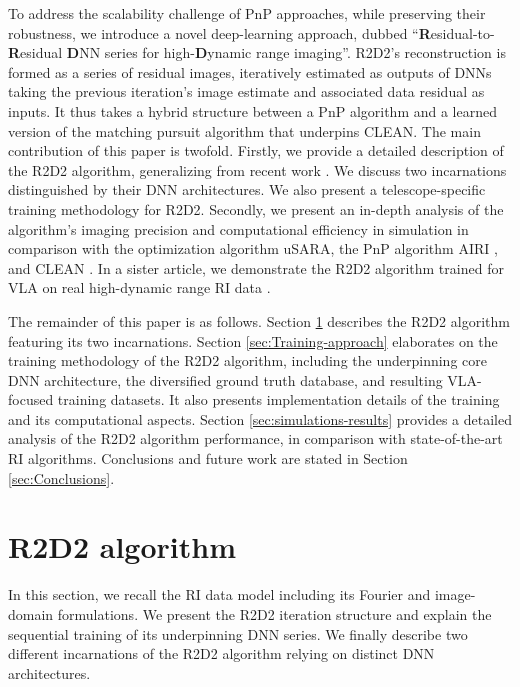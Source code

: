 \documentclass[preprint2,twocolumn]{aastex631}
\begin{document}
To address the scalability challenge of PnP approaches, while preserving their robustness, we introduce a novel deep-learning approach, dubbed ``\textbf{R}esidual-to-\textbf{R}esidual \textbf{D}NN series for high-\textbf{D}ynamic range imaging''. R2D2's reconstruction is formed as a series of residual images, iteratively estimated as outputs of DNNs taking the previous iteration's image estimate and associated data residual as inputs. It thus takes a hybrid structure between a PnP algorithm and a learned version of the matching pursuit algorithm that underpins CLEAN.
The main contribution of this paper is twofold. Firstly, we provide a detailed description of the R2D2 algorithm, generalizing from recent work \citep{aghabiglou2023a,Hauptmann2018}. We discuss two incarnations distinguished by their DNN architectures. We also present a telescope-specific training methodology for R2D2. Secondly, we present an in-depth analysis of the algorithm's imaging precision and computational efficiency in simulation in comparison with the optimization algorithm uSARA, the PnP algorithm AIRI \citep{terris2022}, and CLEAN \citep{offringa2014,offringa2017}. In a sister article, we demonstrate the R2D2 algorithm trained for VLA on real high-dynamic range RI data \citep{dabbech2024}.

The remainder of this paper is as follows. Section \ref{sec:R2D2-algorithm} describes the R2D2 algorithm featuring its two incarnations. Section \ref{sec:Training-approach} elaborates on the training methodology of the R2D2 algorithm, including the underpinning core DNN architecture, the diversified ground truth database, and resulting VLA-focused training datasets. It also presents implementation details of the training and its computational aspects. 
Section \ref{sec:simulations-results} provides a detailed analysis of the R2D2 algorithm performance, in comparison with state-of-the-art RI algorithms. Conclusions and future work are stated in Section \ref{sec:Conclusions}. 

\section{R2D2 algorithm} \label{sec:R2D2-algorithm}
In this section, we recall the RI data model including its Fourier and image-domain formulations. We present the R2D2 iteration structure and explain the sequential training of its underpinning DNN series. We finally describe two different incarnations of the R2D2 algorithm relying on distinct DNN architectures. 
\end{document}
